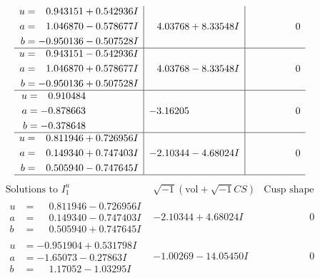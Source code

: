 \documentclass[1p]{elsarticle_modified}
\theoremstyle{definition}
\newcommand{\I}{\sqrt{-1}}
\begin{document}
$$\begin{array}{c|c|c}
\begin{aligned}
u &= \phantom{-}0.943151 + 0.542936 I \\
a &= \phantom{-}1.046870 - 0.578677 I \\
b &= -0.950136 - 0.507528 I\end{aligned}
 & \phantom{-}4.03768 + 8.33548 I & \phantom{-0.000000 } 0 \\ \hline\begin{aligned}
u &= \phantom{-}0.943151 - 0.542936 I \\
a &= \phantom{-}1.046870 + 0.578677 I \\
b &= -0.950136 + 0.507528 I\end{aligned}
 & \phantom{-}4.03768 - 8.33548 I & \phantom{-0.000000 } 0 \\ \hline\begin{aligned}
u &= \phantom{-}0.910484\phantom{ +0.000000I} \\
a &= -0.878663\phantom{ +0.000000I} \\
b &= -0.378648\phantom{ +0.000000I}\end{aligned}
 & -3.16205\phantom{ +0.000000I} & \phantom{-0.000000 } 0 \\ \hline\begin{aligned}
u &= \phantom{-}0.811946 + 0.726956 I \\
a &= \phantom{-}0.149340 + 0.747403 I \\
b &= \phantom{-}0.505940 - 0.747645 I\end{aligned}
 & -2.10344 - 4.68024 I & \phantom{-0.000000 } 0\\
 \hline 
 \end{array}$$\newpage$$\begin{array}{c|c|c}  
\text{Solutions to }I^u_{1}& \I (\text{vol} + \sqrt{-1}CS) & \text{Cusp shape}\\
 \hline 
\begin{aligned}
u &= \phantom{-}0.811946 - 0.726956 I \\
a &= \phantom{-}0.149340 - 0.747403 I \\
b &= \phantom{-}0.505940 + 0.747645 I\end{aligned}
 & -2.10344 + 4.68024 I & \phantom{-0.000000 } 0 \\ \hline\begin{aligned}
u &= -0.951904 + 0.531798 I \\
a &= -1.65073 - 0.27863 I \\
b &= \phantom{-}1.17052 - 1.03295 I\end{aligned}
 & -1.00269 - 14.05450 I & \phantom{-0.000000 } 0 \\ \hline\begin{aligned}

\end{aligned}
\end{array}$$
\end{document}
